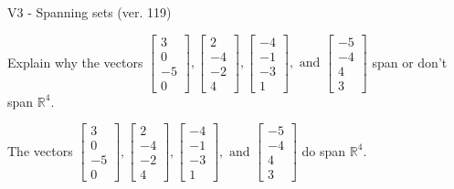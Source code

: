 \begin{exercise}
  \begin{exerciseTitle}V3 - Spanning sets (ver. 119)\end{exerciseTitle}
  \begin{exerciseStatement}
    Explain why the vectors \(\left[\begin{array}{r}
3 \\
0 \\
-5 \\
0
\end{array}\right] , \left[\begin{array}{r}
2 \\
-4 \\
-2 \\
4
\end{array}\right] , \left[\begin{array}{r}
-4 \\
-1 \\
-3 \\
1
\end{array}\right] , \text{ and } \left[\begin{array}{r}
-5 \\
-4 \\
4 \\
3
\end{array}\right]\) span or don't span \(\mathbb{R}^4\). 
	


  \end{exerciseStatement}
  \begin{exerciseAnswer}
   The vectors \(\left[\begin{array}{r}
3 \\
0 \\
-5 \\
0
\end{array}\right] , \left[\begin{array}{r}
2 \\
-4 \\
-2 \\
4
\end{array}\right] , \left[\begin{array}{r}
-4 \\
-1 \\
-3 \\
1
\end{array}\right] , \text{ and } \left[\begin{array}{r}
-5 \\
-4 \\
4 \\
3
\end{array}\right]\) 
  	 do  
	span \(\mathbb{R}^4\).
  


  \end{exerciseAnswer}
\end{exercise}